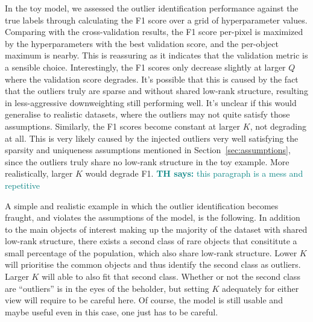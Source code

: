 \documentclass[onecolumn,floatfix]{aastex631}
\newcommand{\tom}[1]{\textcolor{teal}{\textbf{TH says:} #1}}
\begin{document}

In the toy model, we assessed the outlier identification performance against the true labels through calculating the F1 score over a grid of hyperparameter values.
Comparing with the cross-validation results, the F1 score per-pixel is maximized by the hyperparameters with the best validation score, and the per-object maximum is nearby.
This is reassuring as it indicates that the validation metric is a sensible choice.
Interestingly, the F1 scores only decrease slightly at larger $Q$ where the validation score degrades.
It's possible that this is caused by the fact that the outliers truly are sparse and without shared low-rank structure, resulting in less-aggressive downweighting still performing well.
It's unclear if this would generalise to realistic datasets, where the outliers may not quite satisfy those assumptions.
Similarly, the F1 scores become constant at larger $K$, not degrading at all.
This is very likely caused by the injected outliers very well satisfying the sparsity and uniqueness assumptions mentioned in Section~\ref{sec:assumptions}, since the outliers truly share no low-rank structure in the toy example.
More realistically, larger $K$ would degrade F1.
\tom{this paragraph is a mess and repetitive}

A simple and realistic example in which the outlier identification becomes fraught, and violates the assumptions of the model, is the following.
In addition to the main objects of interest making up the majority of the dataset with shared low-rank structure, there exists a second class of rare objects that consititute a small percentage of the population, which also share low-rank structure.
Lower $K$ will prioritise the common objects and thus identify the second class as outliers.
Larger $K$ will able to also fit that second class.
Whether or not the second class are ``outliers'' is in the eyes of the beholder, but setting $K$ adequately for either view will require to be careful here.
Of course, the model is still usable and maybe useful even in this case, one just has to be careful.



\end{document}
